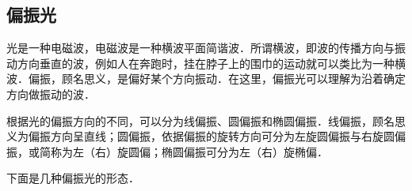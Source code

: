 
\subsection{偏振光}

光是一种电磁波，电磁波是一种横波平面简谐波．所谓横波，即波的传播方向与振动方向垂直的波，例如人在奔跑时，挂在脖子上的围巾的运动就可以类比为一种横波．偏振，顾名思义，是偏好某个方向振动．在这里，偏振光可以理解为沿着确定方向做振动的波．

根据光的偏振方向的不同，可以分为线偏振、圆偏振和椭圆偏振．线偏振，顾名思义为偏振方向呈直线；圆偏振，依据偏振的旋转方向可分为左旋圆偏振与右旋圆偏振，或简称为左（右）旋圆偏；椭圆偏振可分为左（右）旋椭偏．

下面是几种偏振光的形态．